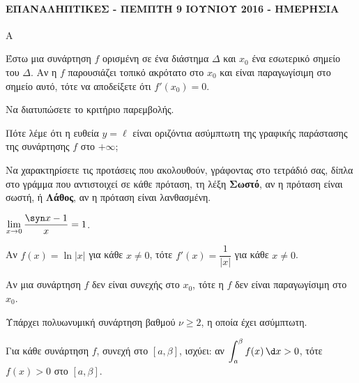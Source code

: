 \paragraph{ΕΠΑΝΑΛΗΠΤΙΚΕΣ - ΠΕΜΠΤΗ 9 ΙΟΥΝΙΟΥ 2016 - ΗΜΕΡΗΣΙΑ}
\begin{thema}{Α}
\begin{erwthma}
    \item Έστω μια συνάρτηση $f$ ορισμένη σε ένα διάστημα $\Delta$ και $x_0$ ένα εσωτερικό σημείο του $\Delta$. Αν η $f$ παρουσιάζει τοπικό ακρότατο στο $x_0$ και είναι παραγωγίσιμη στο σημείο αυτό, τότε να αποδείξετε ότι $f'(x_0) = 0$. 
    \item Να διατυπώσετε το κριτήριο παρεμβολής. 
    \item Πότε λέμε ότι η ευθεία $y = \ell$ είναι οριζόντια ασύμπτωτη της γραφικής παράστασης της συνάρτησης $f$ στο $+\infty$; 
    \item Να χαρακτηρίσετε τις προτάσεις που ακολουθούν, γράφοντας στο τετράδιό σας, δίπλα στο γράμμα που αντιστοιχεί σε κάθε πρόταση, τη λέξη \textbf{Σωστό}, αν η πρόταση είναι σωστή, ή \textbf{Λάθος}, αν η πρόταση είναι λανθασμένη.
    \begin{alist}
        \item $\displaystyle\lim_{x \to 0} \dfrac{\syn x - 1}{x} = 1$.
        \item Αν $f(x) = \ln|x|$ για κάθε $x \neq 0$, τότε $f'(x) = \dfrac{1}{|x|}$ για κάθε $x \neq 0$.
        \item Αν μια συνάρτηση $f$ δεν είναι συνεχής στο $x_0$, τότε η $f$ δεν είναι παραγωγίσιμη στο $x_0$.
        \item Υπάρχει πολυωνυμική συνάρτηση βαθμού $\nu \geq 2$, η οποία έχει ασύμπτωτη.
        \item Για κάθε συνάρτηση $f$, συνεχή στο $[a, \beta]$, ισχύει: αν $\displaystyle\int_{a}^{\beta} f(x)\,\d x > 0$, τότε $f(x) > 0$ στο $[a, \beta]$.
    \end{alist} 
\end{erwthma}
\end{thema}
